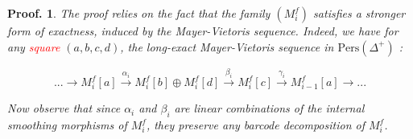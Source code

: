 \documentclass[a4paper, english, 11pt]{article}
\newcommand{\Pe}{\text{Pers}}
\newcommand{\0}{\vec{0}}
\newtheorem*{pf}{Proof.} }
\begin{document}
\begin{pf}
The proof relies on the fact that the family $(M_i^f)$ satisfies a stronger form of exactness, induced by the Mayer-Vietoris sequence. Indeed, we have for any \textcolor{red}{square} $(a,b,c,d)$, the long-exact Mayer-Vietoris sequence in $\Pe(\Delta^+)$ : 

$$...\stackrel{}{\longrightarrow} M_i^f[a] \stackrel{\alpha_i}{\longrightarrow} M_i^f[b] \oplus M_i^f[d] \stackrel{\beta_i}{\longrightarrow} M_i^f[c] \stackrel{\gamma_i}{\longrightarrow} M_{i-1}^f[a] \longrightarrow ...  $$

Now observe that since $\alpha_i$  and $\beta_i$ are linear combinations of the internal smoothing morphisms of $M_i^f$, they preserve any barcode decomposition of $M_i^f$.
\end{pf}



\end{document}
